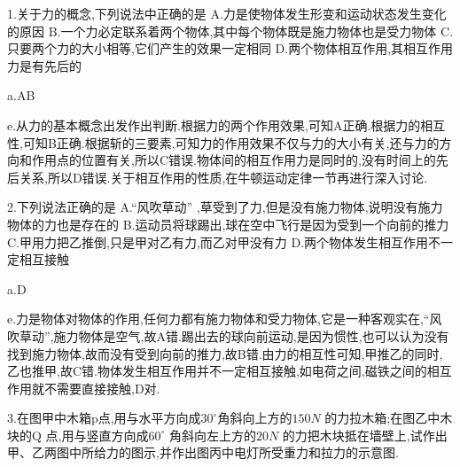 \begin{selection}
  1.关于力的概念,下列说法中正确的是
  A.力是使物体发生形变和运动状态发生变化的原因
  B.一个力必定联系着两个物体,其中每个物体既是施力物体也是受力物体
  C.只要两个力的大小相等,它们产生的效果一定相同
  D.两个物体相互作用,其相互作用力是有先后的

  a.AB

  e.从力的基本概念出发作出判断.根据力的两个作用效果,可知A正确.根据力的相互性,可知B正确.根据斩的三要素,可知力的作用效果不仅与力的大小有关,还与力的方向和作用点的位置有关,所以C错误.物体间的相互作用力是同时的,没有时间上的先后关系,所以D错误.关于相互作用的性质,在牛顿运动定律一节再进行深入讨论.

  2.下列说法正确的是
  A.``风吹草动'' ,草受到了力,但是没有施力物体,说明没有施力物体的力也是存在的
  B.运动员将球踢出,球在空中飞行是因为受到一个向前的推力
  C.甲用力把乙推倒,只是甲对乙有力,而乙对甲没有力
  D.两个物体发生相互作用不一定相互接触

  a.D

  e.力是物体对物体的作用,任何力都有施力物体和受力物体,它是一种客观实在,``风吹草动'',施力物体是空气,故A错.踢出去的球向前运动,是因为惯性,也可以认为没有找到施力物体,故而没有受到向前的推力,故B错.由力的相互性可知,甲推乙的同时,乙也推甲,故C错.物体发生相互作用并不一定相互接触,如电荷之间,磁铁之间的相互作用就不需要直接接触,D对.

\end{selection}

\begin{calculate}
  3.在图甲中木箱p点,用与水平方向成$30^\circ$角斜向上方的$150N$ 的力拉木箱;在图乙中木块的Q 点,用与竖直方向成$60^\circ$  角斜向左上方的$20N$ 的力把木块抵在墙壁上,试作出甲、乙两图中所给力的图示,并作出图丙中电灯所受重力和拉力的示意图.
  
\end{calculate}

